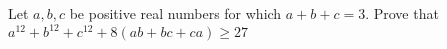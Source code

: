 Let $a, b, c$ be positive real numbers for which $a+b+c=3$. Prove that $a^{12}+b^{12}+c^{12}+8(ab+bc+ca)\ge27$
